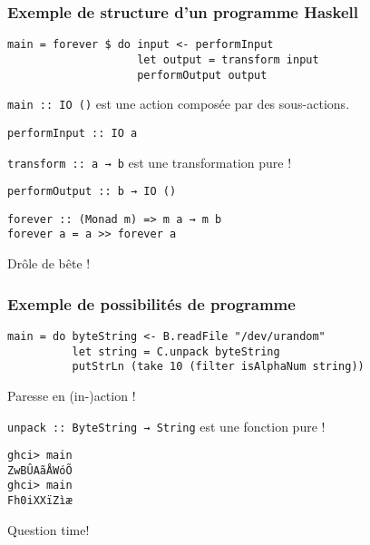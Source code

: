 \documentclass[10pt]{beamer}
\begin{document}
\begin{frame}[fragile]
\frametitle{Exemple de structure d'un programme Haskell}
\begin{verbatim}
main = forever $ do input <- performInput
                    let output = transform input
                    performOutput output
\end{verbatim}

\verb|main :: IO ()| est une action composée par des sous-actions.

\verb|performInput :: IO a|

\verb|transform :: a → b| est une transformation pure !

\verb|performOutput :: b → IO ()|

\pause

\begin{verbatim}
forever :: (Monad m) => m a → m b
forever a = a >> forever a
\end{verbatim}

Drôle de bête !

\end{frame}



\begin{frame}[fragile]
\frametitle{Exemple de possibilités de programme}
\begin{verbatim}
main = do byteString <- B.readFile "/dev/urandom"
          let string = C.unpack byteString
          putStrLn (take 10 (filter isAlphaNum string))
\end{verbatim}

Paresse en (in-)action !

\verb|unpack :: ByteString → String| est une fonction pure !

\begin{verbatim}
ghci> main
ZwBÛAãÅWóÕ
ghci> main
Fh0iXXïZìæ
\end{verbatim}
\end{frame}



\begin{frame}
\centerline{Question time!}
\end{frame}
\end{document}
